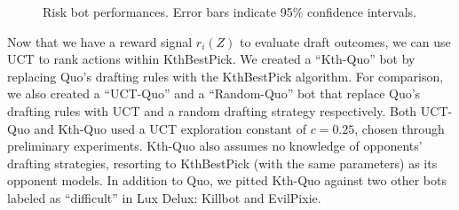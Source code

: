 \documentclass[letterpaper]{article}
\numberwithin{equation}{section}
\numberwithin{theorem}{section}
\numberwithin{lemma}{section}
\numberwithin{df}{section}
\begin{document}
\begin{figure}[t]
{		\label{fig:KthQuoEvilP}
	} %
	\caption[]{Risk bot performances.  Error bars indicate 95\% confidence intervals.}
	\label{fig:RiskResults}
\end{figure}

Now that we have a reward signal $r_i(Z)$ to evaluate draft outcomes, we can use UCT to rank actions within KthBestPick.  We created a ``Kth-Quo'' bot by replacing Quo's drafting rules with the KthBestPick algorithm.  For comparison, we also created a ``UCT-Quo'' and a ``Random-Quo'' bot that replace Quo's drafting rules with UCT and a random drafting strategy respectively.  Both UCT-Quo and Kth-Quo used a UCT exploration constant of $c=0.25$, chosen through preliminary experiments.  Kth-Quo also assumes no knowledge of opponents' drafting strategies, resorting to KthBestPick (with the same parameters) as its opponent models.  In addition to Quo, we pitted Kth-Quo against two other bots labeled as ``difficult'' in Lux Delux: Killbot and EvilPixie.  

\end{document}
